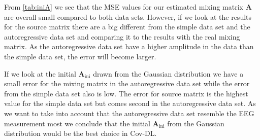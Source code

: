 \noindent
From \ref{tab:iniA} we see that the MSE values for our estimated mixing matrix $\mathbf{A}$ are overall small compared to both data sets. However, if we look at the results for the source matrix there are a big different from the simple data set and the autoregressive data set and comparing it to the results with the real mixing matrix. 
As the autoregressive data set have a higher amplitude in the data than the simple data set, the error will become larger. 

If we look at the initial $\mathbf{A}_{\text{ini}}$ drawn from the Gaussian distribution we have a small error for the mixing matrix in the autoregressive data set while the error from the simple data set also is low. The error for source matrix is the highest value for the simple data set but comes second in the autoregressive data set. As we want to take into account that the autoregressive data set resemble the EEG measurement most we conclude that the initial $\mathbf{A}_{\text{ini}}$ from the Gaussian distribution would be the best choice in Cov-DL.

